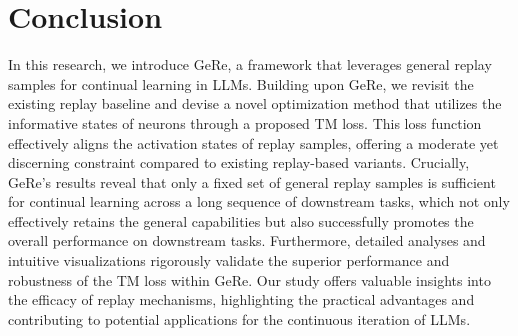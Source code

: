 \section{Conclusion}\label{sec:Conclusion}
In this research, we introduce GeRe, a framework that leverages general replay samples for continual learning in LLMs.
Building upon GeRe, we revisit the existing replay baseline and devise a novel optimization method that utilizes the informative states of neurons through a proposed TM loss.
This loss function effectively aligns the activation states of replay samples, offering a moderate yet discerning constraint compared to existing replay-based variants.
Crucially, GeRe’s results reveal that only a fixed set of general replay samples is sufficient for continual learning across a long sequence of downstream tasks, which not only effectively retains the general capabilities but also successfully promotes the overall performance on downstream tasks.
Furthermore, detailed analyses and intuitive visualizations rigorously validate the superior performance and robustness of the TM loss within GeRe.
Our study offers valuable insights into the efficacy of replay mechanisms, highlighting the practical advantages and contributing to potential applications for the continuous iteration of LLMs.
